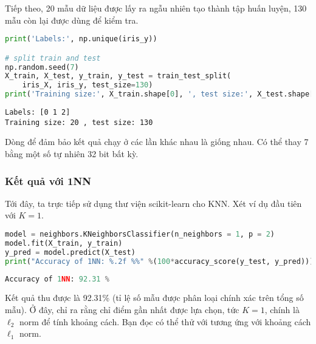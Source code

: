 Tiếp theo, 20 mẫu dữ liệu được lấy ra ngẫu nhiên tạo thành tập huấn luyện, 130 mẫu còn lại được dùng để kiểm tra.

\begin{lstlisting}[language=Python]
print('Labels:', np.unique(iris_y))

# split train and test
np.random.seed(7)
X_train, X_test, y_train, y_test = train_test_split(
    iris_X, iris_y, test_size=130)
print('Training size:', X_train.shape[0], ', test size:', X_test.shape[0])
\end{lstlisting}
\begin{lstlisting}
Labels: [0 1 2]
Training size: 20 , test size: 130
\end{lstlisting}

Dòng  để đảm bảo kết quả chạy ở các lần khác nhau là giống nhau. Có thể thay 7 bằng một số tự
nhiên 32 bit bất kỳ.

\subsubsection{Kết quả với 1NN}
Tới đây, ta trực tiếp sử dụng thư viện scikit-learn cho KNN. Xét ví dụ đầu tiên
với $K = 1$.

\begin{lstlisting}[language=Python]
model = neighbors.KNeighborsClassifier(n_neighbors = 1, p = 2)
model.fit(X_train, y_train)
y_pred = model.predict(X_test)
print("Accuracy of 1NN: %.2f %%" %(100*accuracy_score(y_test, y_pred)))
\end{lstlisting}
\kq
\begin{lstlisting}[language=Python]
Accuracy of 1NN: 92.31 %
\end{lstlisting}

Kết quả thu được là 92.31\% (tỉ lệ số mẫu được phân loại chính xác trên tổng số
mẫu). Ở đây,  chỉ ra rằng chỉ điểm gần nhất được
lựa chọn, tức $K = 1$,  chính là $\ell_2$ norm để tính
khoảng cách. Bạn đọc có thể thử với  tương ứng với khoảng
cách $\ell_1$ norm.







